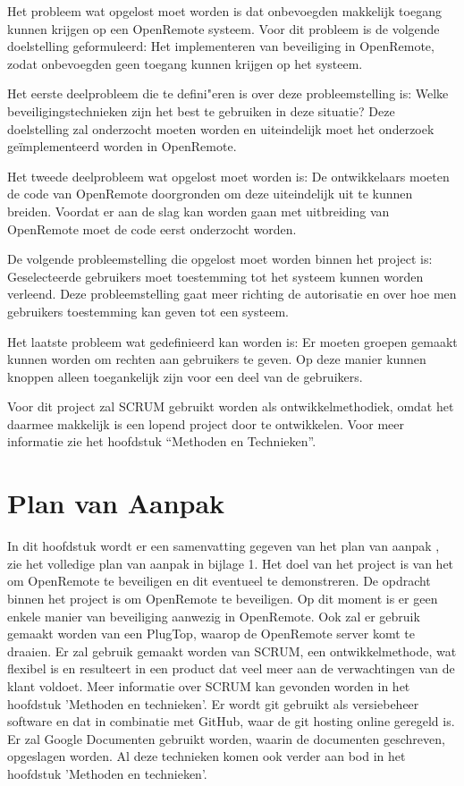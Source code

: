 \documentclass[]{article}
\begin{document}
Het probleem wat opgelost moet worden is dat onbevoegden makkelijk toegang
kunnen krijgen op een OpenRemote systeem. Voor dit probleem is de
volgende doelstelling geformuleerd: Het implementeren van beveiliging in
OpenRemote, zodat onbevoegden geen toegang kunnen krijgen op het systeem.

Het eerste deelprobleem die te defini"eren is over deze probleemstelling is:
Welke beveiligingstechnieken zijn het best te gebruiken in deze situatie?
Deze doelstelling zal onderzocht moeten worden en uiteindelijk moet het
onderzoek ge\"implementeerd worden in OpenRemote.

Het tweede deelprobleem wat opgelost moet worden is: De ontwikkelaars
moeten de code van OpenRemote doorgronden om deze uiteindelijk uit te
kunnen breiden. Voordat er aan de slag kan worden gaan met uitbreiding van
OpenRemote moet de code eerst onderzocht worden.

De volgende probleemstelling die opgelost moet worden binnen het project
is: Geselecteerde gebruikers moet toestemming tot het systeem kunnen worden
verleend. Deze probleemstelling gaat meer richting de autorisatie en over
hoe men gebruikers toestemming kan geven tot een systeem.

Het laatste probleem wat gedefinieerd kan worden is: Er moeten groepen gemaakt
kunnen worden om rechten aan gebruikers te geven. Op deze manier kunnen knoppen
alleen toegankelijk zijn voor een deel van de gebruikers. 

Voor dit project zal SCRUM gebruikt worden als ontwikkelmethodiek, omdat het
daarmee makkelijk is een lopend project door te ontwikkelen. Voor meer
informatie zie het hoofdstuk “Methoden en Technieken”.

\newpage
\section{Plan van Aanpak}

In dit hoofdstuk wordt er een samenvatting gegeven van het plan  van  aanpak
, zie het volledige plan van aanpak in bijlage 1.  Het  doel  van  het
project is  van  het  om  OpenRemote  te  beveiligen  en  dit  eventueel  te
demonstreren.  De  opdracht  binnen  het  project  is   om   OpenRemote   te
beveiligen. Op dit moment is er geen enkele manier van beveiliging  aanwezig
in OpenRemote. Ook zal er gebruik gemaakt worden van een PlugTop, waarop  de
OpenRemote server komt te draaien. Er zal gebruik gemaakt worden van  SCRUM,
een ontwikkelmethode, wat flexibel is en resulteert in een product dat  veel
meer aan de verwachtingen van de klant voldoet. Meer informatie  over  SCRUM
kan gevonden worden in het hoofdstuk 'Methoden en technieken'.
Er wordt git gebruikt als versiebeheer software en  dat  in  combinatie  met
GitHub, waar de git hosting online geregeld is.  Er  zal  Google  Documenten
gebruikt worden, waarin de documenten geschreven, opgeslagen worden.
Al deze technieken komen ook verder aan bod in het  hoofdstuk  'Methoden  en
technieken'.
\end{document}
